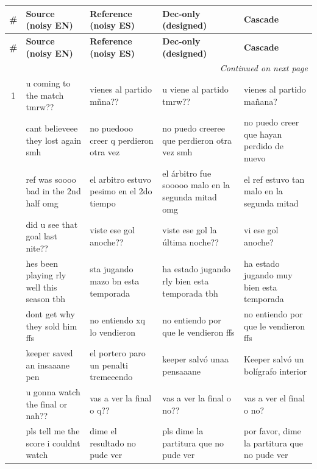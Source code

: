 \documentclass[11pt]{article}
\begin{document}
{\small
\begin{longtable}{c p{3.3cm} p{3.3cm} p{3.3cm} p{3.3cm}}
  \label{tab:full_comparison} \\
  \toprule
  \textbf{\#} & \textbf{Source (noisy EN)} & \textbf{Reference (noisy ES)} &
    \textbf{Dec-only (designed)} & \textbf{Cascade} \\
  \midrule
  \endfirsthead
  \toprule
  \textbf{\#} & \textbf{Source (noisy EN)} & \textbf{Reference (noisy ES)} &
    \textbf{Dec-only (designed)} & \textbf{Cascade} \\
  \midrule
  \endhead
  \midrule
  \multicolumn{5}{r}{\textit{Continued on next page}} \\
  \endfoot
  \bottomrule
  \endlastfoot

  1 & u coming to the match tmrw?? & vienes al partido mñna?? & u viene al partido tmrw?? & vienes al partido mañana? \\
  \addlinespace
  2 & cant believeee they lost again smh & no puedooo creer q perdieron otra vez & no puedo creeree que perdieron otra vez smh & no puedo creer que hayan perdido de nuevo \\
  \addlinespace
  3 & ref was soooo bad in the 2nd half omg & el arbitro estuvo pesimo en el 2do tiempo & el árbitro fue sooooo malo en la segunda mitad omg & el ref estuvo tan malo en la segunda mitad \\
  \addlinespace
  4 & did u see that goal last nite?? & viste ese gol anoche?? & viste ese gol la última noche?? & vi ese gol anoche? \\
  \addlinespace
  5 & hes been playing rly well this season tbh & sta jugando mazo bn esta temporada & ha estado jugando rly bien esta temporada tbh & ha estado jugando muy bien esta temporada \\
  \addlinespace
  6 & dont get why they sold him ffs & no entiendo xq lo vendieron & no entiendo por que le vendieron ffs & no entiendo por que le vendieron ffs \\
  \addlinespace
  7 & keeper saved an insaaane pen & el portero paro un penalti tremeeendo & keeper salvó unaa pensaaane & Keeper salvó un bolígrafo interior \\
  \addlinespace
  8 & u gonna watch the final or nah?? & vas a ver la final o q?? & vas a ver la final o no?? & vas a ver el final o no? \\
  \addlinespace
  9 & pls tell me the score i couldnt watch & dime el resultado no pude ver & pls dime la partitura que no pude ver & por favor, dime la partitura que no pude ver \\

\end{longtable}}
\end{document}
